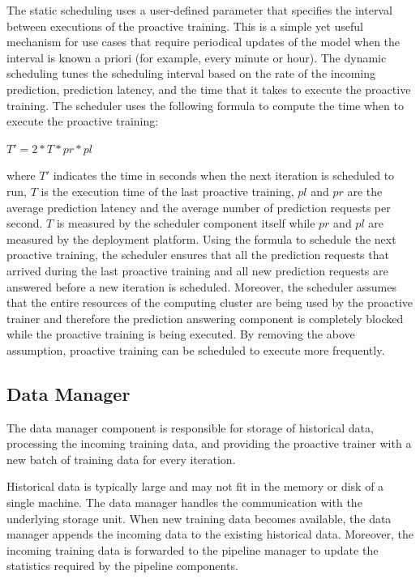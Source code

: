 The static scheduling uses a user-defined parameter that specifies the interval between executions of the proactive training.
This is a simple yet useful mechanism for use cases that require periodical updates of the model when the interval is known a priori (for example, every minute or hour). 
The dynamic scheduling tunes the scheduling interval based on the rate of the incoming prediction, prediction latency, and the time that it takes to execute the proactive training.
The scheduler uses the following formula to compute the time when to execute the proactive training:
\begin{center}
$T' = 2 * T * pr * pl$
\end{center}
where $T'$ indicates the time in seconds when the next iteration is scheduled to run, $T$ is the execution time of the last proactive training, $pl$ and $pr$ are the average prediction latency and the average number of prediction requests per second.
$T$ is measured by the scheduler component itself while $pr$ and $pl$ are measured by the deployment platform.
Using the formula to schedule the next proactive training, the scheduler ensures that all the prediction requests that arrived during the last proactive training and all new prediction requests are answered before a new iteration is scheduled.
Moreover, the scheduler assumes that the entire resources of the computing cluster are being used by the proactive trainer and therefore the prediction answering component is completely blocked while the proactive training is being executed.
By removing the above assumption, proactive training can be scheduled to execute more frequently.

\subsection{Data Manager} \label{data-manager}
The data manager component is responsible for storage of historical data, processing the incoming training data, and providing the proactive trainer with a new batch of training data for every iteration.

Historical data is typically large and may not fit in the memory or disk of a single machine. 
The data manager handles the communication with the underlying storage unit.
When new training data becomes available, the data manager appends the incoming data to the existing historical data.
Moreover, the incoming training data is forwarded to the pipeline manager to update the statistics required by the pipeline components.

